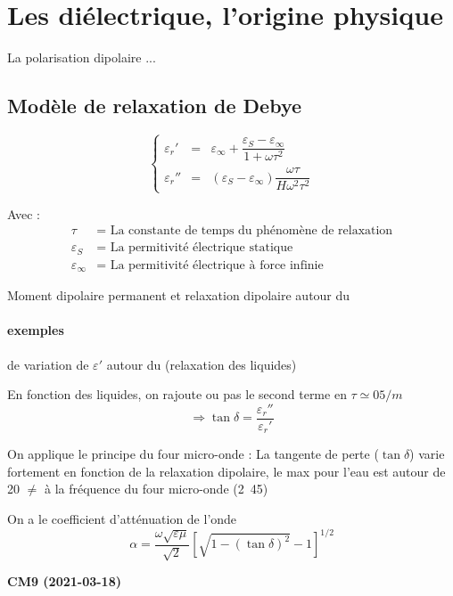 \documentclass[12pt,a4paper]{report}
\begin{document}
\section{Les diélectrique, l'origine physique}

La polarisation dipolaire ...

\subsection{Modèle de relaxation de Debye}

\[
	\left\lbrace
		\begin{array}{rcl}
		\varepsilon_r' & = & \varepsilon_\infty + \dfrac{\varepsilon_S - \varepsilon_\infty}{1 + \omega \tau^2}\\
		\varepsilon_r'' & = & (\varepsilon_S - \varepsilon_\infty) \dfrac{\omega \tau}{H \omega^2 \tau^2}
		\end{array}
	\right.
\]

Avec :
\begin{align*}
	\tau &= \text{ La constante de temps du phénomène de relaxation}\\
	\varepsilon_S &= \text{ La permitivité électrique statique}\\
	\varepsilon_\infty &= \text{ La permitivité électrique à force infinie} 
\end{align*}

Moment dipolaire permanent et relaxation dipolaire autour du \unit{}{\giga\hertz}

\paragraph{exemples} de variation de \(\varepsilon'\) autour du \unit{}{\giga\hertz} (relaxation des liquides)

En fonction des liquides, on rajoute ou pas le second terme en \(\tau \simeq 05/m\)
\[
	\Rightarrow \tan \delta = \dfrac{\varepsilon_r''}{\varepsilon_r'}
\]

On applique le principe du four micro-onde : La tangente de perte (\(\tan \delta\)) varie fortement en fonction de la relaxation dipolaire, le max pour l'eau est autour de \unit{20}{\giga\hertz} \(\neq\) à la fréquence du four micro-onde (\unit{2.45}{\giga\hertz})

On a le coefficient d'atténuation de l'onde
\[
	\alpha = \dfrac{\omega\sqrt{\varepsilon \mu}}{\sqrt{2}} \left[ \sqrt{1-(\tan \delta)^2} - 1 \right]^{1/2}
\]

\begin{center}
\textbf{CM9 (2021-03-18)}
\end{center}
\end{document}
